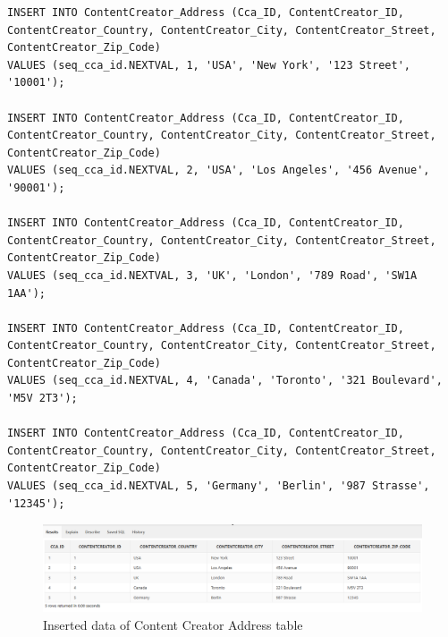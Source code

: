 \begin{lstlisting}[caption={Inserting data into ContentCreator\_Address tables},label={lst:insert_ContentCreator_Address}]
INSERT INTO ContentCreator_Address (Cca_ID, ContentCreator_ID, ContentCreator_Country, ContentCreator_City, ContentCreator_Street, ContentCreator_Zip_Code)
VALUES (seq_cca_id.NEXTVAL, 1, 'USA', 'New York', '123 Street', '10001');

INSERT INTO ContentCreator_Address (Cca_ID, ContentCreator_ID, ContentCreator_Country, ContentCreator_City, ContentCreator_Street, ContentCreator_Zip_Code)
VALUES (seq_cca_id.NEXTVAL, 2, 'USA', 'Los Angeles', '456 Avenue', '90001');

INSERT INTO ContentCreator_Address (Cca_ID, ContentCreator_ID, ContentCreator_Country, ContentCreator_City, ContentCreator_Street, ContentCreator_Zip_Code)
VALUES (seq_cca_id.NEXTVAL, 3, 'UK', 'London', '789 Road', 'SW1A 1AA');

INSERT INTO ContentCreator_Address (Cca_ID, ContentCreator_ID, ContentCreator_Country, ContentCreator_City, ContentCreator_Street, ContentCreator_Zip_Code)
VALUES (seq_cca_id.NEXTVAL, 4, 'Canada', 'Toronto', '321 Boulevard', 'M5V 2T3');

INSERT INTO ContentCreator_Address (Cca_ID, ContentCreator_ID, ContentCreator_Country, ContentCreator_City, ContentCreator_Street, ContentCreator_Zip_Code)
VALUES (seq_cca_id.NEXTVAL, 5, 'Germany', 'Berlin', '987 Strasse', '12345');
\end{lstlisting}
\begin{figure}[H]
    \centering
    \includegraphics[width=1\textwidth]{images/TableData/CONTENTCREATOR_ADDRESS.png}
    \caption{Inserted data of Content Creator Address table}
\end{figure}

